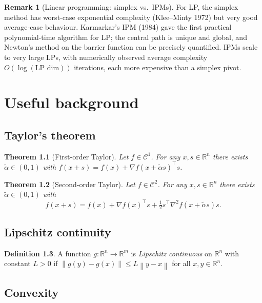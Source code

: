 \documentclass[11pt,a4paper]{report}
\theoremstyle{plain}
\newtheorem{theorem}{Theorem}[chapter]
\theoremstyle{definition}
\newtheorem{definition}[theorem]{Definition}
\newtheorem{remark}[theorem]{Remark}
\newcommand{\R}{\mathbb{R}}
\newcommand{\norm}[1]{\left\lVert#1\right\rVert}
\newcommand{\grad}{\nabla}
\newcommand{\hess}{\nabla^{2}}
\newcommand{\trans}{^{\top}}
\begin{document}
\begin{remark}[Linear programming: simplex vs.\ IPMs]
For LP, the simplex method has worst-case exponential complexity
(Klee--Minty 1972) but very good average-case behaviour. Karmarkar's IPM (1984)
gave the first practical polynomial-time algorithm for LP; the central path is
unique and global, and Newton's method on the barrier function can be precisely
quantified. IPMs scale to very large LPs, with numerically observed average
complexity $O(\log(\text{LP dim}))$ iterations, each more expensive than a
simplex pivot.
\end{remark}

\appendix

\chapter{Useful background}

\section{Taylor's theorem}

\begin{theorem}[First-order Taylor]
Let $f\in\mathcal{C}^{1}$. For any $x,s\in\R^{n}$ there exists $\tilde{\alpha}\in(0,1)$
with $f(x+s)=f(x)+\grad f(x+\tilde{\alpha}s)\trans s$.
\end{theorem}

\begin{theorem}[Second-order Taylor]
Let $f\in\mathcal{C}^{2}$. For any $x,s\in\R^{n}$ there exists $\tilde{\alpha}\in(0,1)$
with
\[
f(x+s)=f(x)+\grad f(x)\trans s+\tfrac12 s\trans\hess f(x+\tilde{\alpha}s)s.
\]
\end{theorem}

\section{Lipschitz continuity}

\begin{definition}
A function $g:\R^{n}\to\R^{m}$ is \emph{Lipschitz continuous} on $\R^{n}$
with constant $L>0$ if $\norm{g(y)-g(x)}\le L\norm{y-x}$ for all $x,y\in\R^{n}$.
\end{definition}

\section{Convexity}
\end{document}
